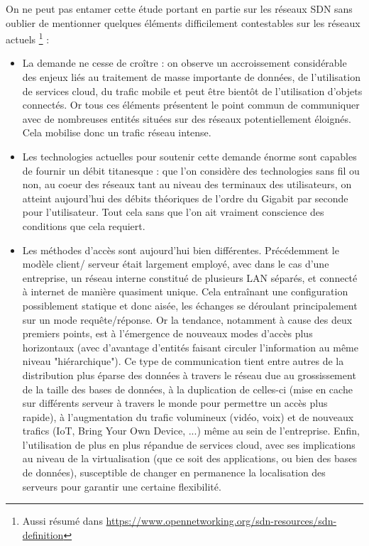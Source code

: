 On ne peut pas entamer cette étude portant en partie sur les réseaux SDN sans oublier de mentionner quelques éléments difficilement contestables sur les réseaux actuels \footnote{\label{of_def}Aussi résumé dans \url{https://www.opennetworking.org/sdn-resources/sdn-definition}} :

\begin{itemize}

\item La demande ne cesse de croître : on observe un accroissement considérable des enjeux liés au traitement de masse importante de données, de l'utilisation de services cloud, du trafic mobile et peut être bientôt de l'utilisation d'objets connectés. Or tous ces éléments présentent le point commun de communiquer avec de nombreuses entités situées sur des réseaux potentiellement éloignés. Cela mobilise donc un trafic réseau intense.

\item Les technologies actuelles pour soutenir cette demande énorme sont capables de fournir un débit titanesque : que l'on considère des technologies sans fil ou non, au coeur des réseaux tant au niveau des terminaux des utilisateurs, on atteint aujourd'hui des débits théoriques de l'ordre du Gigabit par seconde pour l'utilisateur. Tout cela sans que l'on ait vraiment conscience des conditions que cela requiert.

\item Les méthodes d'accès sont aujourd'hui bien différentes. Précédemment le modèle client/ serveur était largement employé, avec dans le cas d'une entreprise, un réseau interne constitué de plusieurs LAN séparés, et connecté à internet de manière quasiment unique. Cela entraînant une configuration possiblement statique et donc aisée, les échanges se déroulant principalement sur un mode requête/réponse. Or la tendance, notamment à cause des deux premiers points, est à l'émergence de nouveaux modes d'accès plus horizontaux (avec d'avantage d'entités faisant circuler l'information au même niveau "hiérarchique"). Ce type de communication tient entre autres de la distribution plus éparse des données à travers le réseau due au grossissement de la taille des bases de données, à la duplication de celles-ci (mise en cache sur différents serveur à travers le monde pour permettre un accès plus rapide), à l'augmentation du trafic volumineux (vidéo, voix) et de nouveaux trafics (IoT, Bring Your Own Device, ...) même au sein de l'entreprise. Enfin, l'utilisation de plus en plus répandue de services cloud, avec ses implications au niveau de la virtualisation (que ce soit des applications, ou bien des bases de données), susceptible de changer en permanence la localisation des serveurs pour garantir une certaine flexibilité.

\end{itemize}

